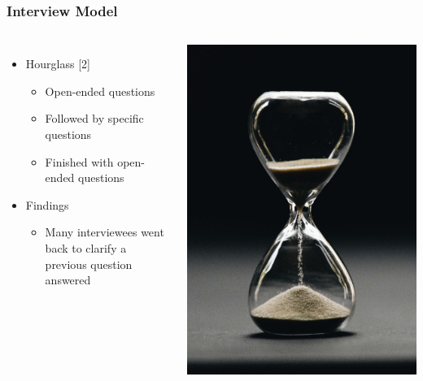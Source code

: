 \documentclass{beamer}
\begin{document}
\begin{frame}
\frametitle{Interview Model}
\begin{columns}
\begin{itemize}
 \item Hourglass [2]
   \begin{itemize}
   \item Open-ended questions
   \item Followed by specific questions
   \item Finished with open-ended questions
  \end{itemize}
 \item Findings
  \begin{itemize}
   \item Many interviewees went back to clarify a previous question answered
  \end{itemize}
\end{itemize}
\centering
\includegraphics[scale = 0.1]{Hourglass}\footnotemark[3]
\end{columns}
\end{frame}
\end{document}
